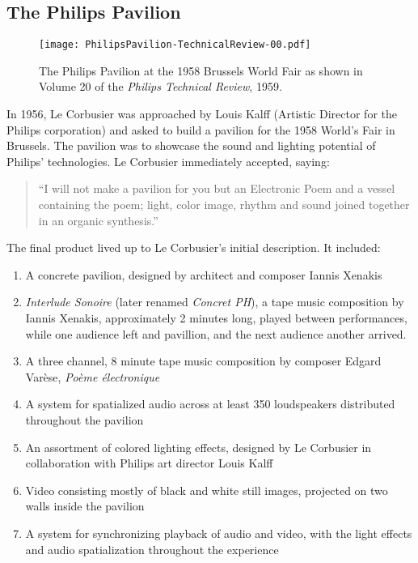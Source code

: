 \subsection{The Philips Pavilion}
\label{sec:philips-pavilion-1}
\begin{figure}[h]
  \texttt{[image: PhilipsPavilion-TechnicalReview-00.pdf]}
  \caption{The Philips Pavilion at the 1958 Brussels World Fair as
    shown in Volume 20 of the \textit{Philips Technical Review}, 1959.}
  \label{fig:philips-pavilion-photo}
\end{figure}
In 1956, Le Corbusier was approached by Louis Kalff (Artistic Director
for the Philips corporation) and asked to build a pavilion for the
1958 World's Fair in Brussels. The pavilion was to showcase the sound
and lighting potential of Philips' technologies. Le Corbusier
immediately accepted, saying:
\begin{quotation}
  ``I will not make a pavilion for you but an Electronic Poem and a
  vessel containing the poem; light, color image, rhythm and sound
  joined together in an organic synthesis.''\cite{Lopez2011} 
\end{quotation}
The final product lived up to Le Corbusier's initial description. It
included:\cite{Lombardo2009}
\begin{enumerate}
\item A concrete pavilion, designed by architect and composer Iannis
  Xenakis
\item \textit{Interlude Sonoire} (later renamed \textit{Concret PH}), a
  tape music composition by Iannis Xenakis, approximately 2 minutes
  long, played between performances, while one audience left and
  pavillion, and the next audience another arrived.
\item A three channel, 8 minute tape music composition by 
  composer Edgard Var\`{e}se, \textit{Po\`{e}me \'{e}lectronique}
\item A system for spatialized audio across at least 350 loudspeakers
  distributed throughout the pavilion
\item An assortment of colored lighting effects, designed by Le Corbusier in
  collaboration with Philips art director Louis Kalff
\item Video consisting mostly of black and white still images,
  projected on two walls inside the pavilion
\item A system for synchronizing playback of audio and video,
  with the light effects and audio spatialization throughout the
  experience
\end{enumerate} 

